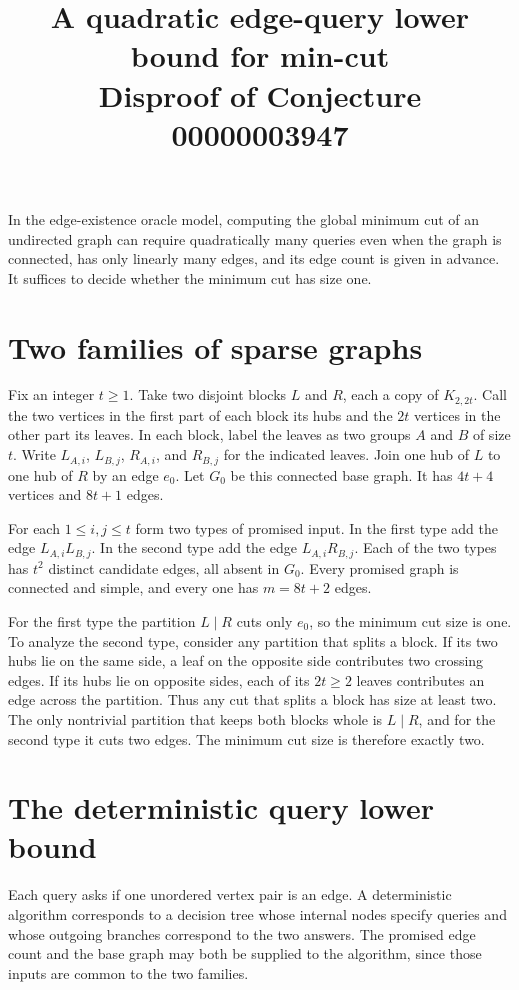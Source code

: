 \documentclass[11pt]{article}
\title{A quadratic edge-query lower bound for min-cut\\[2pt]
  \large Disproof of Conjecture 00000003947}
\author{}
\date{}
\begin{document}
\maketitle

\noindent
In the edge-existence oracle model, computing the global minimum cut of
an undirected graph can require quadratically many queries even when the
graph is connected, has only linearly many edges, and its edge count is
given in advance. It suffices to decide whether the minimum cut has size one.

\section*{Two families of sparse graphs}

Fix an integer $t\ge 1$. Take two disjoint blocks $L$ and $R$, each a copy
of $K_{2,2t}$. Call the two vertices in the first part of each block its
hubs and the $2t$ vertices in the other part its leaves. In each block,
label the leaves as two groups $A$ and $B$ of size $t$. Write $L_{A,i}$,
$L_{B,j}$, $R_{A,i}$, and $R_{B,j}$ for the indicated leaves. Join one hub
of $L$ to one hub of $R$ by an edge $e_0$. Let $G_0$ be this connected base
graph. It has $4t+4$ vertices and $8t+1$ edges.

For each $1\le i,j\le t$ form two types of promised input. In the first
type add the edge $L_{A,i}L_{B,j}$. In the second type add the edge
$L_{A,i}R_{B,j}$. Each of the two types has $t^2$ distinct candidate edges,
all absent in $G_0$. Every promised graph is connected and simple, and
every one has $m=8t+2$ edges.

For the first type the partition $L\mid R$ cuts only $e_0$, so the
minimum cut size is one. To analyze the second type, consider any
partition that splits a block. If its two hubs lie on the same side,
a leaf on the opposite side contributes two crossing edges. If its
hubs lie on opposite sides, each of its $2t\ge2$ leaves contributes an
edge across the partition. Thus any cut that splits a block has size
at least two. The only nontrivial partition that keeps both blocks whole
is $L\mid R$, and for the second type it cuts two edges. The minimum cut
size is therefore exactly two.

\section*{The deterministic query lower bound}

Each query asks if one unordered vertex pair is an edge. A deterministic
algorithm corresponds to a decision tree whose internal nodes specify
queries and whose outgoing branches correspond to the two answers.
The promised edge count and the base graph may both be supplied to the
algorithm, since those inputs are common to the two families.
\end{document}
